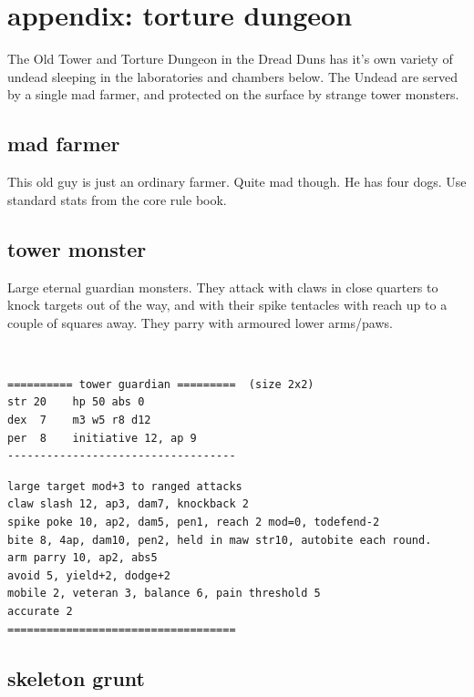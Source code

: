\section*{appendix: torture dungeon}
\label{appendixtorturedungeon}

The Old Tower and Torture Dungeon in the Dread Duns has it's own variety of undead sleeping in the laboratories and chambers below. The Undead are served by a single mad farmer, and protected on the surface by strange tower monsters.


\subsection*{mad farmer}

This old guy is just an ordinary farmer. Quite mad though. He has four dogs. Use standard stats from the core rule book.


\goodbreak 
\subsection*{tower monster}
\label{towermonster}

Large eternal guardian monsters. They attack with claws in close quarters to knock targets out of the way, and with their spike tentacles with reach up to a couple of squares away. They parry with armoured lower arms/paws. 

\

\small \begin{samepage} \begin{verbatim}
========== tower guardian =========  (size 2x2)
str 20    hp 50 abs 0
dex  7    m3 w5 r8 d12
per  8    initiative 12, ap 9
-----------------------------------
\end{verbatim} \goodbreak \begin{verbatim}
large target mod+3 to ranged attacks
claw slash 12, ap3, dam7, knockback 2
spike poke 10, ap2, dam5, pen1, reach 2 mod=0, todefend-2
bite 8, 4ap, dam10, pen2, held in maw str10, autobite each round.
arm parry 10, ap2, abs5
avoid 5, yield+2, dodge+2
mobile 2, veteran 3, balance 6, pain threshold 5
accurate 2
===================================
\end{verbatim} \end{samepage} \normalsize



\goodbreak 
\subsection*{skeleton grunt}
\label{skeletongrunt}

